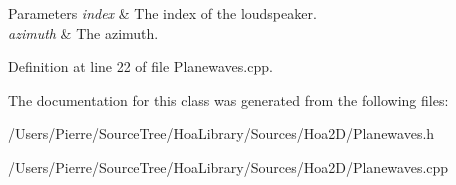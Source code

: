 \begin{DoxyParams}{Parameters}
{\em index} & The index of the loudspeaker. \\
\hline
{\em azimuth} & The azimuth. \\
\hline
\end{DoxyParams}


Definition at line 22 of file Planewaves.\-cpp.



The documentation for this class was generated from the following files\-:\begin{DoxyCompactItemize}
\item 
/\-Users/\-Pierre/\-Source\-Tree/\-Hoa\-Library/\-Sources/\-Hoa2\-D/Planewaves.\-h\item 
/\-Users/\-Pierre/\-Source\-Tree/\-Hoa\-Library/\-Sources/\-Hoa2\-D/Planewaves.\-cpp\end{DoxyCompactItemize}
